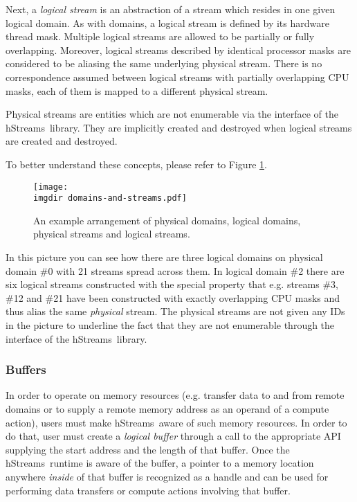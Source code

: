 \documentclass[a4,oneside]{book}
\newcommand{\hstreams}{hStreams}
\newcommand{\imgdir}{../../../doc/images/}
\begin{document}
Next, a \emph{logical stream} is an abstraction of a stream which resides in one given logical domain.
As with domains, a logical stream is defined by its hardware thread mask.
Multiple logical streams are allowed to be partially or fully overlapping.
Moreover, logical streams described by identical processor masks are considered to be aliasing the same underlying physical stream.
There is no correspondence assumed between logical streams with partially overlapping CPU masks, each of them is mapped to a different physical stream.

Physical streams are entities which are not enumerable via the interface of the \hstreams\ library.
They are implicitly created and destroyed when logical streams are created and destroyed.

To better understand these concepts, please refer to Figure \ref{fig:phys-log-dom-str}.
\begin{figure}[h]
    \centering
    \texttt{[image: \\imgdir domains-and-streams.pdf]}
    \caption{An example arrangement of physical domains, logical domains, physical streams and logical streams.}
    \label{fig:phys-log-dom-str}
\end{figure}
In this picture you can see how there are three logical domains on physical domain \#0 with 21 streams spread across them.
In logical domain \#2 there are six logical streams constructed with the special property that e.g. streams \#3, \#12 and \#21 have been constructed with exactly overlapping CPU masks and thus alias the same \emph{physical} stream.
The physical streams are not given any IDs in the picture to underline the fact that they are not enumerable through the interface of the \hstreams\ library.

\subsubsection{Buffers}
In order to operate on memory resources (e.g. transfer data to and from remote domains or to supply a remote memory address as an operand of a compute action), users must make \hstreams\ aware of such memory resources.
In order to do that, user must create a \emph{logical buffer} through a call to the appropriate API supplying the start address and the length of that buffer.
Once the \hstreams\ runtime is aware of the buffer, a pointer to a memory location anywhere \emph{inside} of that buffer is recognized as a handle and can be used for performing data transfers or compute actions involving that buffer.
\end{document}
